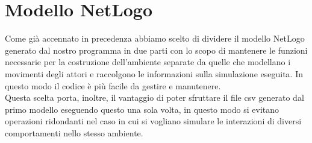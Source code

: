\section{Modello NetLogo}
Come già accennato in precedenza abbiamo scelto di dividere il modello NetLogo generato dal nostro programma in due parti con lo scopo di mantenere le funzioni necessarie per la costruzione dell'ambiente separate da quelle che modellano i movimenti degli attori e raccolgono le informazioni sulla simulazione eseguita. In questo modo il codice è più facile da gestire e manutenere.\\
Questa scelta porta, inoltre, il vantaggio di poter sfruttare il file csv generato dal primo modello eseguendo questo una sola volta, in questo modo si evitano operazioni ridondanti nel caso in cui si vogliano simulare le interazioni di diversi comportamenti nello stesso ambiente.
